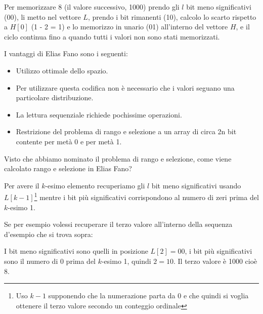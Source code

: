 Per memorizzare 8 (il valore successivo, 1000) prendo gli $l$ bit meno significativi (00), li metto nel vettore $L$, prendo i bit rimanenti (10), calcolo lo scarto rispetto a $H[0]$ (1 - 2 = 1) e lo memorizzo in unario (01) all'interno del vettore $H$, e il ciclo continua fino a quando tutti i valori non sono stati memorizzati.

I vantaggi di Elias Fano sono i seguenti:
\begin{itemize}
    \item Utilizzo ottimale dello spazio.
    \item Per utilizzare questa codifica non è necessario che i valori seguano una particolare distribuzione.
    \item La lettura sequenziale richiede pochissime operazioni.
    \item Restrizione del problema di rango e selezione a un array di circa 2n bit contente per metà 0 e per metà 1.
\end{itemize}
Visto che abbiamo nominato il problema di rango e selezione, come viene calcolato rango e selezione in Elias Fano?

Per avere il $k$-esimo elemento recuperiamo gli $l$ bit meno significativi usando $L[k - 1]$\footnote{Uso $k - 1$ supponendo che la numerazione parta da 0 e che quindi si voglia ottenere il terzo valore secondo un conteggio ordinale} mentre i bit più significativi corrispondono al numero di zeri prima del $k$-esimo 1.

Se per esempio volessi recuperare il terzo valore all'interno della sequenza d'esempio che si trova sopra:

I bit meno significativi sono quelli in posizione $L[2] = 00$, i bit più significativi sono il numero di 0 prima del $k$-esimo 1, quindi $2 = 10$. Il terzo valore è 1000 cioè $8$.

